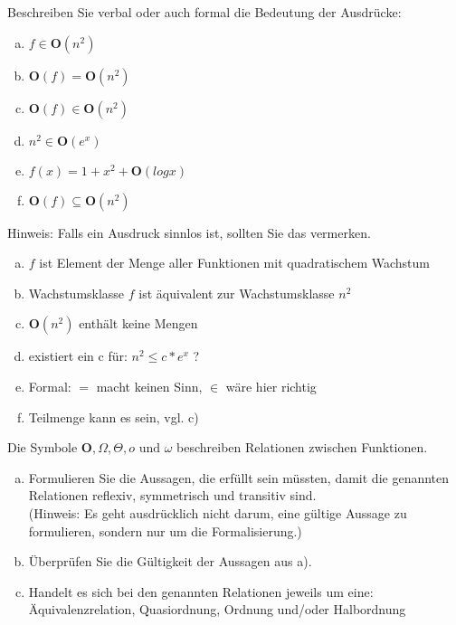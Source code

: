 \begin{card}
	Beschreiben Sie verbal oder auch formal die Bedeutung der Ausdrücke: 
	\begin{enumerate}[a)]
	\item $f \in \mathbf{O}(n^2)$
	\item $\mathbf{O}(f) = \mathbf{O}(n^2)$
	\item $\mathbf{O}(f) \in \mathbf{O}(n^2)$
	\item $n^2 \in \mathbf{O}(e^x)$
	\item $f(x) = 1+x^2+\mathbf{O}(log x)$
	\item $\mathbf{O}(f) \subseteq \mathbf{O}(n^2)$
	\end{enumerate}
	Hinweis: Falls ein Ausdruck sinnlos ist, sollten Sie das vermerken.
	\hr
	\begin{enumerate}[a)]
	\item $f$ ist Element der Menge aller Funktionen mit quadratischem Wachstum
	\item Wachstumsklasse $f$ ist äquivalent zur Wachstumsklasse $n^2$
	\item \lightning  $\mathbf{O}(n^2)$ enthält keine Mengen
	\item existiert ein c für: $n^2 \leq c * e^x$ ?
	\item Formal: $=$ macht keinen Sinn, $\in$ wäre hier richtig
	\item Teilmenge kann es sein, vgl. c)
	\end{enumerate}
\end{card}

\begin{card}
	Die Symbole $\mathbf{O}, \Omega, \Theta,o \text{ und } \omega$ beschreiben Relationen zwischen Funktionen.
	\begin{enumerate}[a)]
	\item Formulieren Sie die Aussagen, die erfüllt sein müssten, damit die genannten Relationen reflexiv, symmetrisch und transitiv sind.\\
	(Hinweis: Es geht ausdrücklich nicht darum, eine gültige Aussage zu formulieren,
	sondern nur um die Formalisierung.)
	\item Überprüfen Sie die Gültigkeit der Aussagen aus a). 
	\item Handelt es sich bei den genannten Relationen jeweils um eine:
	Äquivalenzrelation, Quasiordnung, Ordnung und/oder Halbordnung 
	\end{enumerate}
\end{card}
